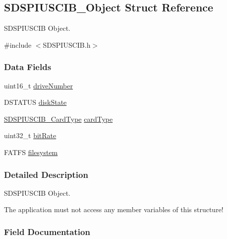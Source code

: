 \subsection{S\+D\+S\+P\+I\+U\+S\+C\+I\+B\+\_\+\+Object Struct Reference}
\label{struct_s_d_s_p_i_u_s_c_i_b___object}


S\+D\+S\+P\+I\+U\+S\+C\+I\+B Object.  




{\ttfamily \#include $<$S\+D\+S\+P\+I\+U\+S\+C\+I\+B.\+h$>$}

\subsubsection*{Data Fields}
\begin{DoxyCompactItemize}
\item 
uint16\+\_\+t \hyperlink{struct_s_d_s_p_i_u_s_c_i_b___object_ab6b2fabeb6f979e53c0c45cec5a6d077}{drive\+Number}
\item 
D\+S\+T\+A\+T\+U\+S \hyperlink{struct_s_d_s_p_i_u_s_c_i_b___object_a8a06926e3f24ad32bfdfc137e83bfe33}{disk\+State}
\item 
\hyperlink{_s_d_s_p_i_u_s_c_i_b_8h_a82051f5c4a349b60bc2205ec32cd74c1}{S\+D\+S\+P\+I\+U\+S\+C\+I\+B\+\_\+\+Card\+Type} \hyperlink{struct_s_d_s_p_i_u_s_c_i_b___object_a53b9575a67a6518c5851911c8a964490}{card\+Type}
\item 
uint32\+\_\+t \hyperlink{struct_s_d_s_p_i_u_s_c_i_b___object_a2ce744b1a395098f2c7374672a80b775}{bit\+Rate}
\item 
F\+A\+T\+F\+S \hyperlink{struct_s_d_s_p_i_u_s_c_i_b___object_ab60030313e4f2c6eb0d3b523d38ad5f4}{filesystem}
\end{DoxyCompactItemize}


\subsubsection{Detailed Description}
S\+D\+S\+P\+I\+U\+S\+C\+I\+B Object. 

The application must not access any member variables of this structure! 

\subsubsection{Field Documentation}
